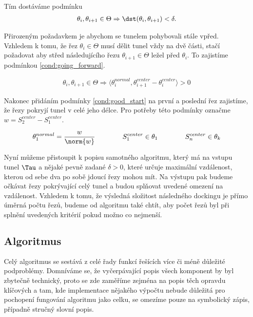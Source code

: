 Tím dostáváme podmínku
\begin{align}
    \theta_i, \theta_{i+1} \in \Theta \Rightarrow \dst(\theta_i, \theta_{i+1}) < \delta.
    \label{cond:distance}
\end{align}


Přirozeným požadavkem je abychom se tunelem pohybovali stále vpřed.
Vzhledem k tomu, že řez $ \theta_i \in \Theta $ musí dělit tunel vždy na dvě části, stačí
požadovat aby střed následujícího řezu $ \theta_{i + 1} \in \Theta $ ležel před
$ \theta_i $. To zajistíme podmínkou \ref{cond:going_forward}.

\begin{align}
    \theta_i, \theta_{i+1} \in \Theta
        \Rightarrow \langle \theta_i^{normal}, \theta_{i+1}^{center} - \theta_i^{center} \rangle > 0
        \label{cond:going_forward}
\end{align}

Nakonec přidáním podmínky \ref{cond:good_start} na první a poslední řez zajistíme,
že řezy pokryjí tunel v celé jeho délce. Pro potřeby této podmínky označme
$ w = S_2^{center} - S_1^{center} $.

\begin{align}
    \theta_1^{normal} = \frac{w}{\norm{w}}
    \qquad  \qquad S_1^{center} \in \theta_1
    \qquad  \qquad S_n^{center} \in \theta_k
    \label{cond:good_start}
\end{align}

Nyní můžeme přistoupit k popisu samotného algoritmu, který má na vstupu tunel $ \Tau $
a nějaké pevně zadané $ \delta > 0$, které určuje maximální vzdálenost, kterou
od sebe dva po sobě jdoucí řezy mohou mít. Na výstupu pak budeme očkávat řezy pokrývající
celý tunel a budou splňovat uvedené omezení na vzdálenost. Vzhledem k tomu, že výsledná
složitost následného dockingu je přímo úměrná počtu řezů, budeme od algoritmu také chtít,
aby počet řezů byl při splnění uvedených kritérií pokud možno co nejmenší.


\subsection{Algoritmus}

Celý algoritmus se sestává z celé řady funkcí řešících více či méně důležité podproblémy.
Domníváme se, že vyčerpávající popis všech komponent by byl zbytečně technický,
proto se zde zaměříme zejména na popis těch opravdu klíčových
a tam, kde implementace nějakého výpočtu nebude důležitá pro pochopení fungování
algoritmu jako celku, se omezíme pouze na symbolický zápis, případně stručný slovní
popis.

